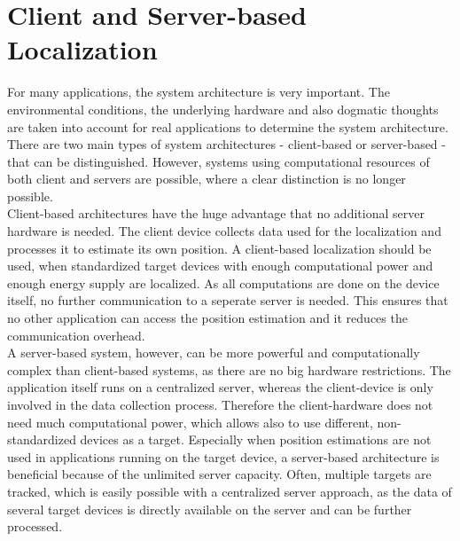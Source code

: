 \section{Client and Server-based Localization}
For many applications, the system architecture is very important. The environmental conditions, the underlying hardware and also dogmatic thoughts are taken into account for real applications to determine the system architecture. There are two main types of system architectures - client-based or server-based - that can be distinguished. However, systems using computational resources of both client and servers are possible, where a clear distinction is no longer possible.\\
\noindent\hspace*{5mm}%
Client-based architectures have the huge advantage that no additional server hardware is needed. The client device collects data used for the localization and processes it to estimate its own position. A client-based localization should be used, when standardized target devices with enough computational power and enough energy supply are localized. As all computations are done on the device itself, no further communication to a seperate server is needed. This ensures that no other application can access the position estimation and it reduces the communication overhead.\\
\noindent\hspace*{5mm}%
A server-based system, however, can be more powerful and computationally complex than client-based systems, as there are no big hardware restrictions. The application itself runs on a centralized server, whereas the client-device is only involved in the data collection process. Therefore the client-hardware does not need much computational power, which allows also to use different, non-standardized devices as a target. Especially when position estimations are not used in applications running on the target device, a server-based architecture is beneficial because of the unlimited server capacity. Often, multiple targets are tracked, which is easily possible with a centralized server approach, as the data of several target devices is directly available on the server and can be further processed. 


